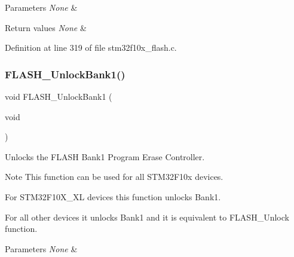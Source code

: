 \begin{DoxyParams}{Parameters}
{\em None} & \\
\hline
\end{DoxyParams}

\begin{DoxyRetVals}{Return values}
{\em None} & \\
\hline
\end{DoxyRetVals}


Definition at line 319 of file stm32f10x\+\_\+flash.\+c.

\mbox{\label{group___f_l_a_s_h___private___functions_ga358c4b7e0ef20693ca62cc9d20c94a5a}} 
\subsubsection{\texorpdfstring{F\+L\+A\+S\+H\+\_\+\+Unlock\+Bank1()}{FLASH\_UnlockBank1()}}
{\footnotesize\ttfamily void F\+L\+A\+S\+H\+\_\+\+Unlock\+Bank1 (\begin{DoxyParamCaption}\item[{void}]{ }\end{DoxyParamCaption})}



Unlocks the F\+L\+A\+SH Bank1 Program Erase Controller. 

\begin{DoxyNote}{Note}
This function can be used for all S\+T\+M32\+F10x devices.
\begin{DoxyItemize}
\item For S\+T\+M32\+F10\+X\+\_\+\+XL devices this function unlocks Bank1.
\item For all other devices it unlocks Bank1 and it is equivalent to F\+L\+A\+S\+H\+\_\+\+Unlock function. 
\end{DoxyItemize}
\end{DoxyNote}

\begin{DoxyParams}{Parameters}
{\em None} & \\
\hline
\end{DoxyParams}

